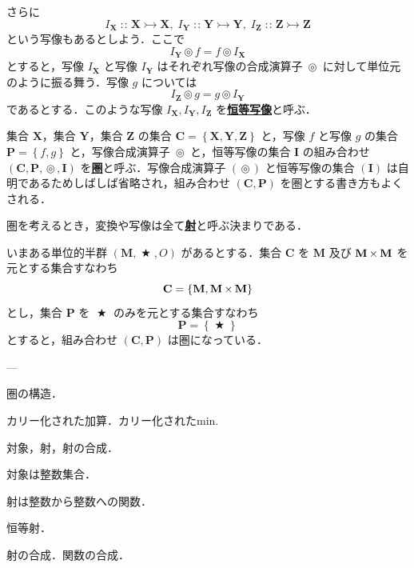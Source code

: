 \documentclass[a4paper,twocolumn]{jsbook}
\newcommand{\keyword}[1]{{\underline{\textbf{#1}}}}
\DeclareMathOperator{\mBinOp}{\bigstar}
\DeclareMathOperator{\mCompProj}{\circledcirc}
\DeclareMathOperator{\mIn}{{:\!:}}
\DeclareMathOperator{\mMorphTo}{\rightarrowtail}
\DeclareMathOperator{\mSetTimes}{\boldmath{\times}}
\newcommand{\mSet}[1]{\mathbf{#1}}
\newcommand{\mSetWith}[1]{\left\{#1\right\}}
\newcommand{\mTupleWith}[1]{\left(#1\right)}
\newcommand{\mMorph}[2]{#1\mMorphTo#2}
\begin{document}
さらに
\begin{equation}
I_\mSet{X}\mIn\mMorph{\mSet{X}}{\mSet{X}},\;
I_\mSet{Y}\mIn\mMorph{\mSet{Y}}{\mSet{Y}},\;
I_\mSet{Z}\mIn\mMorph{\mSet{Z}}{\mSet{Z}}
\end{equation}
という写像もあるとしよう．ここで
\begin{equation}
I_\mSet{Y}\mCompProj f=f\mCompProj I_\mSet{X}
\end{equation}
とすると，写像 $I_\mSet{X}$ と写像 $I_\mSet{Y}$ はそれぞれ写像の合成演算子 $\mCompProj$ に対して単位元のように振る舞う．写像 $g$ については
\begin{equation}
I_\mSet{Z}\mCompProj g=g\mCompProj I_\mSet{Y}
\end{equation}
であるとする．このような写像 $I_\mSet{X},I_\mSet{Y},I_\mSet{Z}$ を\keyword{恒等写像}と呼ぶ．

集合 $\mSet{X}$，集合 $\mSet{Y}$，集合 $\mSet{Z}$ の集合 $\mSet{C}=\mSetWith{\mSet{X},\mSet{Y},\mSet{Z}}$ と，写像 $f$ と写像 $g$ の集合 $\mSet{P}=\mSetWith{f,g}$ と，写像合成演算子 $\mCompProj$ と，恒等写像の集合 $\mSet{I}$ の組み合わせ $\mTupleWith{\mSet{C},\mSet{P},\mCompProj,\mSet{I}}$ を\keyword{圏}と呼ぶ．写像合成演算子 $(\mCompProj)$ と恒等写像の集合 $(\mSet{I})$ は自明であるためしばしば省略され，組み合わせ $\mTupleWith{\mSet{C},\mSet{P}}$ を圏とする書き方もよくされる．

圏を考えるとき，変換や写像は全て\keyword{射}と呼ぶ決まりである．

いまある単位的半群 $\mTupleWith{\mSet{M},\mBinOp,O}$ があるとする．集合 $\mSet{C}$ を $\mSet{M}$ 及び $\mSet{M}\mSetTimes\mSet{M}$ を元とする集合すなわち
\begin{equation}
\mSet{C}=\mSetWith{\mSet{M},\mSet{M}\mSetTimes\mSet{M}}
\end{equation}
とし，集合 $\mSet{P}$ を $\mBinOp$ のみを元とする集合すなわち
\begin{equation}
\mSet{P}=\mSetWith{\mBinOp}
\end{equation}
とすると，組み合わせ $\mTupleWith{\mSet{C},\mSet{P}}$ は圏になっている．

---

圏の構造．

カリー化された加算．カリー化されたmin.

対象，射，射の合成．

対象は整数集合．

射は整数から整数への関数．

恒等射．

射の合成．関数の合成．
\end{document}
